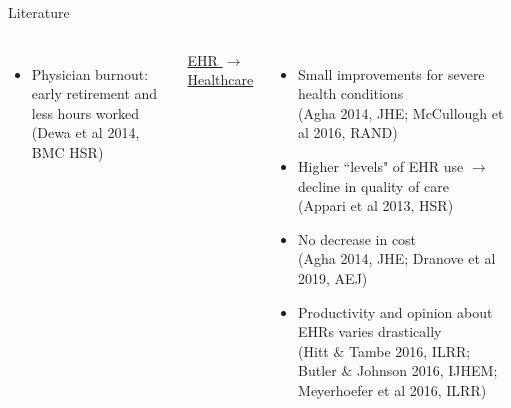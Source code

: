 \documentclass[10pt]{beamer}
\begin{document}
\begin{frame}{Literature}
\begin{columns}
\begin{itemize}
            \item Physician burnout: early retirement and less hours worked \\ \vspace{1mm} 
            \tiny (Dewa et al 2014, BMC HSR)
        \end{itemize}
        
        \centering
        \color{gray}
        \underline{ EHR $\rightarrow$ Healthcare }
        \vspace{-1mm}
        \begin{itemize}
        \color{gray}
            \item Small improvements for severe health conditions \\ \vspace{1mm}
            \tiny(Agha 2014, JHE; McCullough et al 2016, RAND)
            
            \footnotesize
            
            \item Higher ``levels" of EHR use $\rightarrow$ decline in quality of care\\ \vspace{1mm}
            \tiny (Appari et al 2013, HSR)
            
            \footnotesize 
            
            \item No decrease in cost \\ \vspace{1mm}
            \tiny (Agha 2014, JHE; Dranove et al 2019, AEJ) 
            
            \footnotesize
            
            \item Productivity and opinion about EHRs varies drastically \\ \vspace{1mm}
            \tiny (Hitt $\&$ Tambe 2016, ILRR; Butler $\&$ Johnson 2016, IJHEM; Meyerhoefer et al 2016, ILRR)
            
        \end{itemize}
        
\end{columns}



\end{frame}
\end{document}
